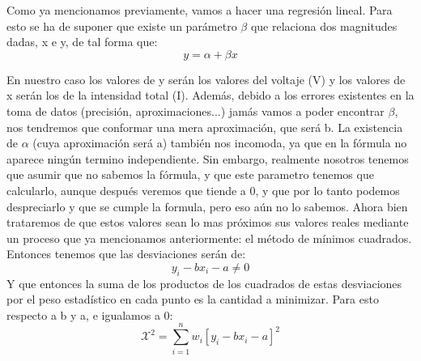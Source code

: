 \documentclass[10pt,a4paper]{article}
\begin{document}
Como ya mencionamos previamente, vamos a hacer una regresión lineal. Para esto se ha de suponer que existe un parámetro $\beta$ que relaciona dos magnitudes dadas, x e y, de tal forma que:
\begin{equation}
y = \alpha + \beta x \label{Dependencia función lineal}
\end{equation}

En nuestro caso los valores de y serán los valores del voltaje (V) y los valores de x serán los de la intensidad total (I). Además, debido a los errores existentes en la toma de datos (precisión, aproximaciones...) jamás vamos a poder encontrar $\beta$, nos tendremos que conformar una mera  aproximación, que será b. La existencia de $\alpha$ (cuya aproximación será a) también nos incomoda, ya que en la fórmula no aparece ningún termino independiente. Sin embargo, realmente nosotros tenemos que asumir que no sabemos la fórmula, y que este parametro tenemos que calcularlo, aunque después veremos que tiende a 0, y que por lo tanto podemos despreciarlo y que se cumple la formula, pero eso aún no lo sabemos. Ahora bien trataremos de que estos valores sean lo mas próximos sus valores reales mediante un proceso que ya mencionamos anteriormente: el método de mínimos cuadrados.\\

Entonces tenemos que las desviaciones serán de:
\begin{equation}
y_i-bx_i - a\neq 0 \label{Valor de las desviaciones}
\end{equation}
Y que entonces la suma de los productos de los cuadrados de estas desviaciones por el peso estadístico en cada punto es la cantidad a minimizar. Para esto respecto a b y a, e igualamos a 0:
\begin{equation}
\mathcal{X}^2=\sum_{i=1}^n w_i[y_i-bx_i-a]^2
\end{equation}
\end{document}
